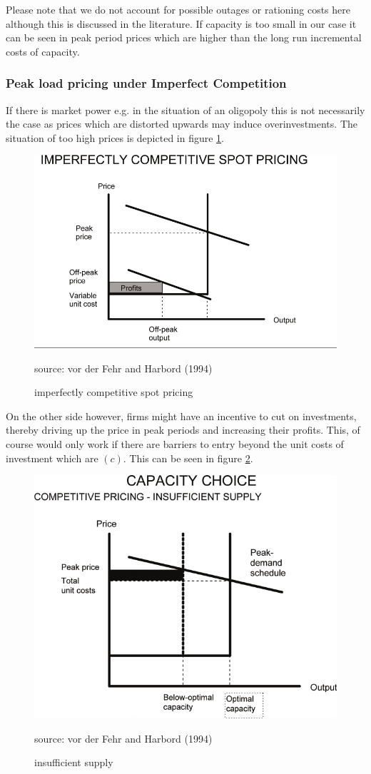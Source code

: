 Please note that we do not account for possible outages or rationing costs here although this is discussed in the literature. If capacity is too small in our case it can be seen in peak period prices which are higher than the long run incremental costs of capacity.

\subsubsection{Peak load pricing under Imperfect Competition}

If there is market power e.g. in the situation of an oligopoly this is not necessarily the case as prices which are distorted upwards may induce overinvestments. The situation of too high prices is depicted in figure \ref{peak_load_toohigh}. 

\begin{figure}[h]
\centering
\includegraphics[width=.5\textwidth]{capacity/peak_load_toohigh}
      \label{peak_load_toohigh}            
      \caption{imperfectly competitive spot pricing}
       source: vor der Fehr and Harbord (1994)
\end{figure}

On the other side however, firms might have an incentive to cut on investments, thereby driving up the price in peak periods and increasing their profits. This, of course would only work if there are barriers to entry beyond the unit costs of investment which are $(c)$. This can be seen in figure \ref{peak_load_insufficient}.

\begin{figure}[h]
\centering
\includegraphics[width=.5\textwidth]{capacity/peak_load_insufficient}
      \label{peak_load_insufficient}            
      \caption{insufficient supply}
       source: vor der Fehr and Harbord (1994)
\end{figure}

